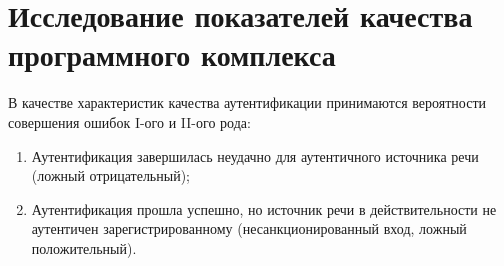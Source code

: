\documentclass[12pt]{article}
\begin{document}
\begin{figure}[htp!]
\end{figure}


\section{Исследование показателей качества программного комплекса}

В качестве характеристик качества аутентификации принимаются вероятности совершения ошибок I-ого и II-ого рода:
\begin{enumerate}
\item Аутентификация завершилась неудачно для аутентичного источника речи (ложный отрицательный);
\item Аутентификация прошла успешно, но источник речи в действительности не аутентичен зарегистрированному (несанкционированный вход, ложный положительный).
\end{enumerate}
\end{document}
